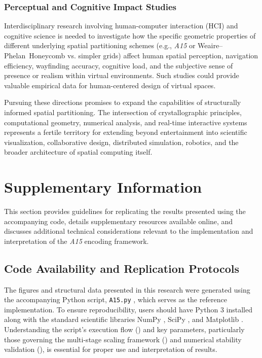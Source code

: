 \documentclass[10pt]{article}
\def\AAAB{\textit{A15}}
\def\WP{Weaire--Phelan}
\def\WPH{\WP{}~Honeycomb}
\begin{document}
\subsubsection{Perceptual and Cognitive Impact Studies}\label{subsubsec-outlook-perception}
Interdisciplinary research involving human-computer interaction (HCI) and cognitive science is needed to investigate how the specific geometric properties of different underlying spatial partitioning schemes (e.g., \AAAB{} or \WPH{} vs. simpler grids) affect human spatial perception, navigation efficiency, wayfinding accuracy, cognitive load, and the subjective sense of presence or realism within virtual environments. Such studies could provide valuable empirical data for human-centered design of virtual spaces.

\vspace{\parskip}
Pursuing these directions promises to expand the capabilities of structurally informed spatial partitioning. The intersection of crystallographic principles, computational geometry, numerical analysis, and real-time interactive systems represents a fertile territory for extending beyond entertainment into scientific visualization, collaborative design, distributed simulation, robotics, and the broader architecture of spatial computing itself.

\section{Supplementary Information}\label{sec-supplementary}

This section provides guidelines for replicating the results presented using the accompanying code, details supplementary resources available online, and discusses additional technical considerations relevant to the implementation and interpretation of the \AAAB{} encoding framework.

\subsection{Code Availability and Replication Protocols}\label{subsec-replication}

The figures and structural data presented in this research were generated using the accompanying Python script, \texttt{A15.py} \cite{Risinger2024A15}, which serves as the reference implementation. To ensure reproducibility, users should have Python 3 installed along with the standard scientific libraries NumPy \cite{Harris2020}, SciPy \cite{Virtanen2020}, and Matplotlib \cite{Hunter2007}. Understanding the script's execution flow () and key parameters, particularly those governing the multi-stage scaling framework () and numerical stability validation (), is essential for proper use and interpretation of results.
\end{document}
